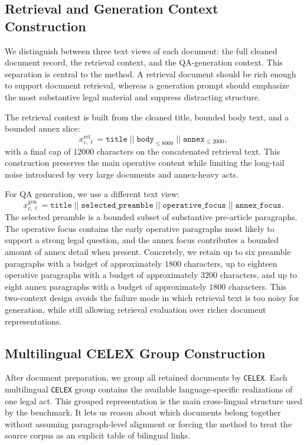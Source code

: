 \subsection{Retrieval and Generation Context Construction}

We distinguish between three text views of each document: the full cleaned document record, the retrieval context, and the QA-generation context. This separation is central to the method. A retrieval document should be rich enough to support document retrieval, whereas a generation prompt should emphasize the most substantive legal material and suppress distracting structure.

The retrieval context is built from the cleaned title, bounded body text, and a bounded annex slice:
\[
x^{\mathrm{ret}}_{c,\ell} =
\texttt{title}
\; || \;
\texttt{body}_{\leq 8000}
\; || \;
\texttt{annex}_{\leq 2000},
\]
with a final cap of \(12000\) characters on the concatenated retrieval text. This construction preserves the main operative content while limiting the long-tail noise introduced by very large documents and annex-heavy acts.

For QA generation, we use a different text view:
\[
x^{\mathrm{gen}}_{c,\ell} =
\texttt{title}
\; || \;
\texttt{selected\_preamble}
\; || \;
\texttt{operative\_focus}
\; || \;
\texttt{annex\_focus}.
\]
The selected preamble is a bounded subset of substantive pre-article paragraphs. The operative focus contains the early operative paragraphs most likely to support a strong legal question, and the annex focus contributes a bounded amount of annex detail when present. Concretely, we retain up to six preamble paragraphs with a budget of approximately \(1800\) characters, up to eighteen operative paragraphs with a budget of approximately \(3200\) characters, and up to eight annex paragraphs with a budget of approximately \(1800\) characters. This two-context design avoids the failure mode in which retrieval text is too noisy for generation, while still allowing retrieval evaluation over richer document representations.

\subsection{Multilingual CELEX Group Construction}

After document preparation, we group all retained documents by \texttt{CELEX}. Each multilingual \texttt{CELEX} group contains the available language-specific realizations of one legal act. This grouped representation is the main cross-lingual structure used by the benchmark. It lets us reason about which documents belong together without assuming paragraph-level alignment or forcing the method to treat the source corpus as an explicit table of bilingual links.

